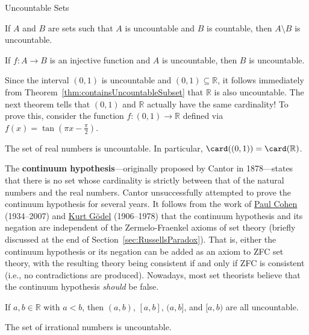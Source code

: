 \begin{section}{Uncountable Sets}
\begin{corollary}
If $A$ and $B$ are sets such that $A$ is uncountable and $B$ is countable, then $A\setminus B$ is uncountable.
\end{corollary}

\begin{theorem}
If $f:A\to B$ is an injective function and $A$ is uncountable, then $B$ is uncountable.
\end{theorem}

Since the interval $(0,1)$ is uncountable and $(0,1)\subseteq \mathbb{R}$, it follows immediately from Theorem~\ref{thm:containsUncountableSubset} that $\mathbb{R}$ is also uncountable.  The next theorem tells that $(0,1)$ and $\mathbb{R}$ actually have the same cardinality! To prove this, consider the function $f:(0,1)\to \mathbb{R}$ defined via $f(x)=\tan(\pi x-\frac{\pi}{2})$.

\begin{theorem}\label{thm:R uncountable}
The set of real numbers is uncountable.  In particular, $\card((0,1))=\card(\mathbb{R})$.
\end{theorem}

The \textbf{continuum hypothesis}---originally proposed by Cantor in 1878---states that there is no set whose cardinality is strictly between that of the natural numbers and the real numbers. Cantor unsuccessfully attempted to prove the continuum hypothesis for several years. It follows from the work of \href{https://en.wikipedia.org/wiki/Paul_Cohen}{Paul Cohen} (1934--2007) and \href{https://en.wikipedia.org/wiki/Kurt_Godel}{Kurt G\"odel} (1906--1978) that the continuum hypothesis and its negation are independent of the Zermelo-Fraenkel axioms of set theory (briefly discussed at the end of Section~\ref{sec:RussellsParadox}). That is, either the continuum hypothesis or its negation can be added as an axiom to ZFC set theory, with the resulting theory being consistent if and only if ZFC is consistent (i.e., no contradictions are produced). Nowadays, most set theorists believe that the continuum hypothesis \emph{should} be false.

\begin{theorem}
If $a,b\in\mathbb{R}$ with $a<b$, then $(a,b)$, $[a,b]$, $(a,b]$, and $[a,b)$ are all uncountable.
\end{theorem}

\begin{theorem}
The set of irrational numbers is uncountable.
\end{theorem}


\end{section}
